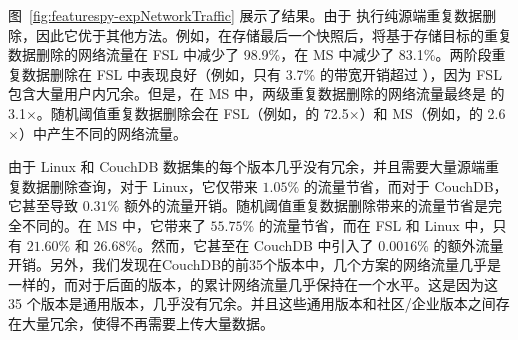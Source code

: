 图~\ref{fig:featurespy-expNetworkTraffic} 展示了结果。由于 \prototype 执行纯源端重复数据删除，因此它优于其他方法。例如，在存储最后一个快照后，\prototype 将基于存储目标的重复数据删除的网络流量在 FSL 中减少了 98.9\%，在 MS 中减少了 83.1\%。两阶段重复数据删除在 ​​FSL 中表现良好（例如，只有 3.7\% 的带宽开销超过 \prototype），因为 FSL 包含大量用户内冗余。但是，在 MS 中，两级重复数据删除的网络流量最终是 \prototype 的 3.1$\times$。随机阈值重复数据删除会在 FSL（例如，\prototype 的 72.5$\times$）和 MS（例如，\prototype 的 2.6$\times$）中产生不同的网络流量。

由于 Linux 和 CouchDB 数据集的每个版本几乎没有冗余，并且需要大量源端重复数据删除查询，对于 Linux，它仅带来 $1.05\%$ 的流量节省，而对于 CouchDB，它甚至导致 $0.31 \%$ 额外的流量开销。随机阈值重复数据删除带来的流量节省是完全不同的。在 MS 中，它带来了 $55.75\%$ 的流量节省，而在 FSL 和 Linux 中，只有 $21.60\%$ 和 $26.68\%$。然而，它甚至在 CouchDB 中引入了 $0.0016\%$ 的额外流量开销。另外，我们发现在CouchDB的前35个版本中，几个方案的网络流量几乎是一样的，而对于后面的版本，\prototype 的累计网络流量几乎保持在一个水平。这是因为这 35 个版本是通用版本，几乎没有冗余。并且这些通用版本和社区/企业版本之间存在大量冗余，使得\prototype 不再需要上传大量数据。